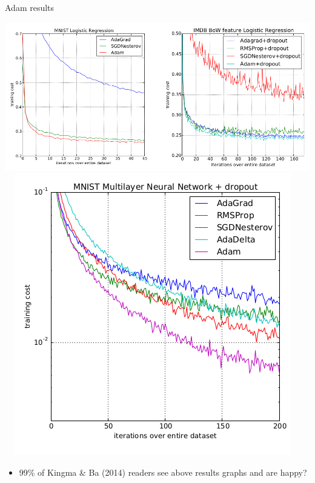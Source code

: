 \documentclass[xcolor={svgnames},
               hyperref={colorlinks,citecolor=DeepPink4,linkcolor=FireBrick,urlcolor=Maroon},
               usepdftitle=false]  %
               {beamer}
\begin{document}
\begin{frame}{Adam results}

\begin{center}
\mbox{\includegraphics[height=0.42\textheight]{figs/adam-results.png} \,
\includegraphics[height=0.42\textheight]{figs/adam-results-nn.png}}
\end{center}
\begin{itemize}
\item 99\% of Kingma \& Ba (2014) readers see above results graphs and are happy?
\end{itemize}
\end{frame}
\end{document}
